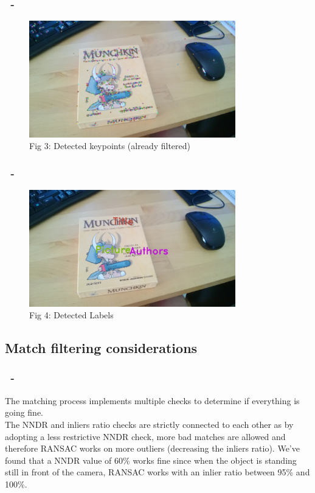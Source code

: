 \documentclass{beamer}
\begin{document}
  \begin{frame}
    \frametitle{\insertsection\ - \insertsubsection}
	\begin{figure}
		\centering
		\includegraphics[width=0.8\textwidth]{images/sampleKeypoints.jpg}\\
		Fig 3: Detected keypoints (already filtered)
	\end{figure}
  \end{frame}

  \begin{frame}
    \frametitle{\insertsection\ - \insertsubsection}
	\begin{figure}
		\centering
		\includegraphics[width=0.8\textwidth]{images/sampleLabels.jpg}\\
		Fig 4: Detected Labels
	\end{figure}
  \end{frame}

  \subsection{Match filtering considerations}

  \begin{frame}
	\frametitle{\insertsection\ - \insertsubsection}
	The matching process implements multiple checks to determine if everything
	is going fine.\\
	The NNDR and inliers ratio checks are strictly connected to each other
	as by adopting a less restrictive NNDR check, more bad matches are allowed
	and therefore RANSAC works on more outliers (decreasing the inliers ratio).
	We've found that a NNDR value of 60\% works fine since when the object is
	standing still in front of the camera, RANSAC works with an inlier ratio
	between 95\% and 100\%.
  \end{frame}
\end{document}
